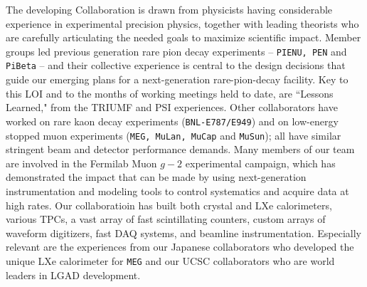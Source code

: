 The developing \nexp Collaboration is drawn from physicists having considerable experience in experimental precision physics, together with leading theorists who are carefully articulating the needed goals to maximize scientific impact.
%
Member groups led previous generation rare pion decay experiments -- {\tt PIENU, PEN} and {\tt PiBeta} -- and their collective experience is central to the design decisions that guide our emerging plans for a next-generation rare-pion-decay facility.
Key to this LOI and to the months of working meetings held to date, are ``Lessons Learned," from the TRIUMF and PSI experiences.
Other collaborators have worked on rare kaon decay experiments ({\tt BNL-E787/E949}) and on low-energy stopped muon experiments ({\tt MEG, MuLan, MuCap} and {\tt MuSun}); all have similar stringent beam and detector performance demands.
%
Many members of our team are involved in the Fermilab Muon $g-2$ experimental campaign, which has demonstrated the impact that can be made by using next-generation instrumentation and modeling tools to control systematics and acquire data at high rates.
Our collaboratioin has built both crystal and LXe calorimeters, various TPCs, a vast array of fast scintillating counters, custom arrays of waveform digitizers, fast DAQ systems, and beamline instrumentation.
Especially relevant are the experiences from our Japanese collaborators who developed the unique LXe calorimeter for {\tt MEG} and our UCSC collaborators who are  world leaders in LGAD development.
